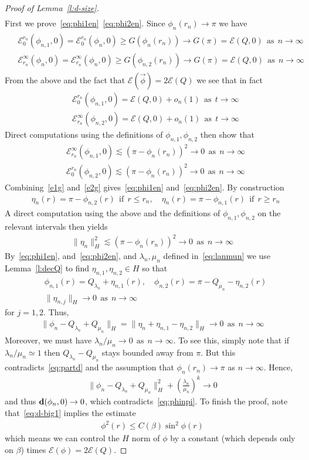 \documentclass[10pt,reqno]{amsart}
\newcommand{\E}{\mathcal{E}}
\newcommand{\be}{\beta}
\newcommand{\la}{\lambda}
\newcommand{\ant}[1]{\begin{align*}\begin{split} #1 \end{split}\end{align*}}
\newcommand{\EQ}[1]{\begin{equation}\begin{split} #1 \end{split}\end{equation}}
\numberwithin{equation}{section}
\theoremstyle{remark}
\newcommand{\mif}{{\ \ \text{if} \ \ }}
\newcommand{\mas}{{\ \ \text{as} \ \ }}
\newcommand{\0}{\emptyset}
\newcommand{\bfd}{{\bf d}}
\begin{document}
\begin{proof}[Proof of Lemma~\ref{l:d-size}]
\begin{align}
 \end{align}
First we prove~\eqref{eq:phi1en}~\eqref{eq:phi2en}. Since $\phi_n(r_n) \to \pi$ we have 
 \ant{
 &\E_0^{r_n}(\phi_{n, 1}, 0)  =  \E_0^{r_n}( \phi_{n}, 0)  \ge G( \phi_{n}(r_n)) \to G( \pi) = \E(Q, 0) \mas n \to \infty \\
 &\E_{r_n}^\infty(\phi_{n}, 0)  =  \E_{r_n}^\infty( \phi_{n}, 0)  \ge G( \phi_{n, 2}(r_n)) \to G( \pi) = \E(Q, 0) \mas n \to \infty 
}
From the above and the fact that $\E( \vec \phi) = 2 \E(Q)$ we see that in fact
\EQ{ \label{e1g}
&\E_0^{r_n}(\phi_{n, 1}, 0) = \E(Q, 0) + o_n(1) \mas t \to \infty \\
&\E_{r_n}^\infty(\phi_{n, 2}, 0) = \E(Q, 0) + o_n(1) \mas t \to \infty
}
Direct computations using the definitions of $\phi_{n, 1}, \phi_{n, 2}$  then show that 
\EQ{ \label{e2g}
&\E_{r_n}^{\infty}(\phi_{n, 1}, 0)  \lesssim  \left(  \pi - \phi_n(r_n) \right)^2 \to 0 \mas n \to \infty  \\
&\E_0^{r_n}(\phi_{n, 2}, 0)  \lesssim \left(  \pi -\phi_n(r_n) \right)^2 \to 0 \mas n \to \infty 
}
Combining~\eqref{e1g} and~\eqref{e2g} gives~\eqref{eq:phi1en} and~\eqref{eq:phi2en}. By construction
 \EQ{
 &\eta_n( r) =  \pi - \phi_{n, 2}( r) \mif r \le r_n, \quad  \eta_n( r)  =  \pi - \phi_{n, 1}( r) \mif r \ge r_n
 }
 A direct computation using the above and the definitions of $\phi_{n, 1}, \phi_{n, 2}$ on the relevant intervals then yields
  \EQ{
   \|\eta_n \|_{H}^2 \lesssim  \left(  \pi - \phi_n(r_n) \right)^2 \to 0 \mas n \to \infty
   }
   By~\eqref{eq:phi1en}, and~\eqref{eq:phi2en}, and $\la_n, \mu_n$ defined in~\eqref{eq:lanmun} we  use Lemma~\ref{l:decQ} to find $\eta_{n, 1}, \eta_{n, 2} \in H$ so that  
   \EQ{
   & \phi_{n, 1}( r) =  Q_{\la_n} + \eta_{n, 1}(r) , \quad  \phi_{n, 2}( r) = \pi -   Q_{\mu_n} - \eta_{n, 2}(r) \\
      &\| \eta_{n, j} \|_{H} \to 0 \mas n \to \infty
      }
      for 
      $j  = 1, 2$. 
  Thus, 
 \EQ{\label{eq:partd}
 \| \phi_{n} - Q_{\la_n} + Q_{\mu_n} \|_{H}  = \| \eta_n + \eta_{n, 1} -  \eta_{n, 2} \|_H \to 0 \mas n \to \infty
 }
 Moreover, we must have $\la_n/ \mu_n \to 0 \mas n \to \infty$. To see this, simply note that if $\la_n/ \mu_n \simeq 1$ then $Q_{\la_n} - Q_{\mu_n}$ stays bounded away from $\pi$. But this contradicts~\eqref{eq:partd} and the assumption that $\phi_n(r_n) \to \pi$ as $n \to \infty$. Hence, 
 \EQ{
  \| \phi_{n} - Q_{\la_n} + Q_{\mu_n} \|_{H}^{2} +\left( \frac{\la_n}{\mu_n}\right)^k \to 0
 }
 and thus $\bfd(\phi_n, 0) \to 0$, which contradicts~\eqref{eq:phinpi}. To finish the proof, note that~\eqref{eq:d-big1}  implies the estimate 
 \EQ{
 \phi^2(r) \le C(\be) \sin^2 \phi(r)
 }
 which means we can control the $H$ norm of $\phi$ by a constant (which depends only on $\be$) times $\E(\phi) = 2\E(Q)$. 


\end{proof}
\end{document}

